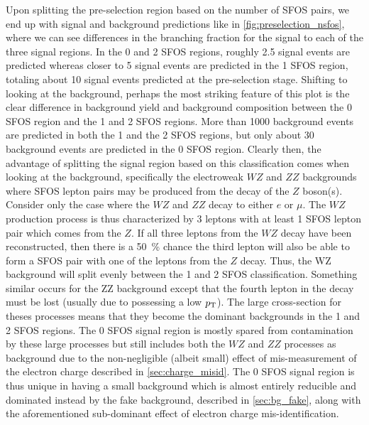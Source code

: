 Upon splitting the pre-selection region based on the number of SFOS
pairs, we end up with signal and background predictions like in 
\fig\ref{fig:preselection_nsfos}, where we can see differences
in the branching fraction for the signal to each of the three signal regions.
In the 0 and 2 SFOS regions, roughly 2.5 signal events are predicted
whereas closer to 5 signal events are predicted in the 1 SFOS region,
totaling about 10 signal events predicted at the pre-selection stage.
Shifting to looking at the background, perhaps the most striking 
feature of this plot is the 
clear difference in background yield and background composition
between the 0 SFOS region and the 1 and 2 SFOS regions.
More than 1000 background events are predicted in both the 1 and
the 2 SFOS regions, but only about 30 background events are
predicted in the 0 SFOS region.
Clearly then, the advantage of splitting the signal region based on this
classification comes when looking at the background, specifically the
electroweak $WZ$ and $ZZ$ backgrounds where SFOS lepton pairs may be
produced from the decay of the $Z$ boson(s). Consider only the case
where the $WZ$ and $ZZ$ decay to either $e$ or $\mu$.  The $WZ$ production
process is thus characterized by 3 leptons with at least 1 SFOS lepton pair
which comes from the $Z$. If all three leptons from the $WZ$ decay have been
reconstructed, then there is a 50~\% chance the third lepton 
will also be able to form a SFOS pair with one of the leptons from the $Z$ decay.
Thus, the WZ background will split evenly between the 1 and 2 SFOS classification.
Something similar occurs for the ZZ background except that the fourth lepton 
in the decay must be lost (usually due to possessing a low $p_{\mathrm{T}}$).
The large cross-section for theses processes means that
they become the dominant backgrounds in the 1 and 2 SFOS regions.  
The 0 SFOS signal region is mostly spared from contamination  by 
these large processes but still
includes both the $WZ$ and $ZZ$ processes as background due to the
non-negligible (albeit small) effect of mis-measurement of the electron
charge described in \sec\ref{sec:charge_misid}.  The 0 SFOS signal region
is thus unique in having a small background which is almost entirely
reducible and dominated instead by the fake background,
described in \sec\ref{sec:bg_fake},
along with the aforementioned sub-dominant effect of electron charge 
mis-identification.






